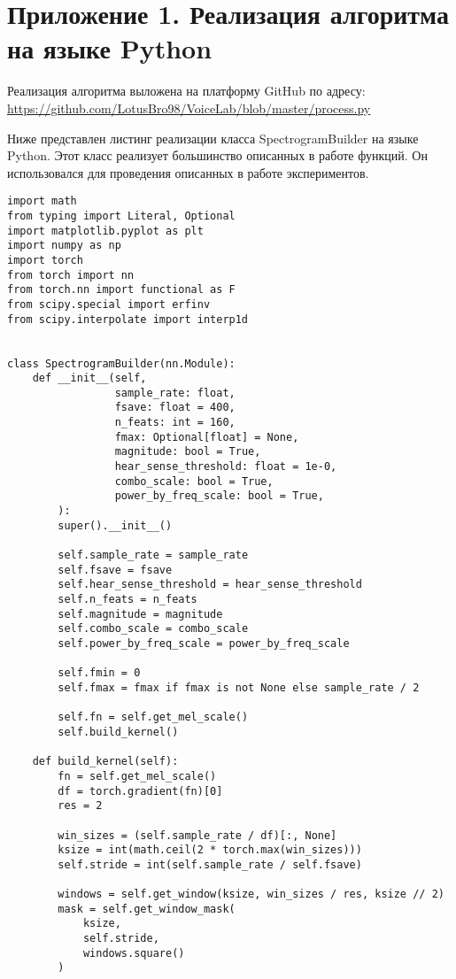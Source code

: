 
\chapter{Приложение 1. Реализация алгоритма на языке Python}
\label{app:app1}

Реализация алгоритма выложена на платформу GitHub по адресу:
\url{https://github.com/LotusBro98/VoiceLab/blob/master/process.py}

Ниже представлен листинг реализации класса SpectrogramBuilder на языке Python. Этот класс реализует большинство описанных в работе функций.
Он использовался для проведения описанных в работе экспериментов.


\begin{verbatim}
import math
from typing import Literal, Optional
import matplotlib.pyplot as plt
import numpy as np
import torch
from torch import nn
from torch.nn import functional as F
from scipy.special import erfinv
from scipy.interpolate import interp1d


class SpectrogramBuilder(nn.Module):
    def __init__(self, 
                 sample_rate: float, 
                 fsave: float = 400,
                 n_feats: int = 160,
                 fmax: Optional[float] = None,
                 magnitude: bool = True,
                 hear_sense_threshold: float = 1e-0,
                 combo_scale: bool = True,
                 power_by_freq_scale: bool = True,         
        ):
        super().__init__()

        self.sample_rate = sample_rate
        self.fsave = fsave
        self.hear_sense_threshold = hear_sense_threshold
        self.n_feats = n_feats
        self.magnitude = magnitude
        self.combo_scale = combo_scale
        self.power_by_freq_scale = power_by_freq_scale

        self.fmin = 0
        self.fmax = fmax if fmax is not None else sample_rate / 2

        self.fn = self.get_mel_scale()
        self.build_kernel()

    def build_kernel(self):
        fn = self.get_mel_scale()
        df = torch.gradient(fn)[0]
        res = 2

        win_sizes = (self.sample_rate / df)[:, None]
        ksize = int(math.ceil(2 * torch.max(win_sizes)))
        self.stride = int(self.sample_rate / self.fsave)

        windows = self.get_window(ksize, win_sizes / res, ksize // 2)
        mask = self.get_window_mask(
            ksize, 
            self.stride, 
            windows.square()
        )


\end{verbatim}
